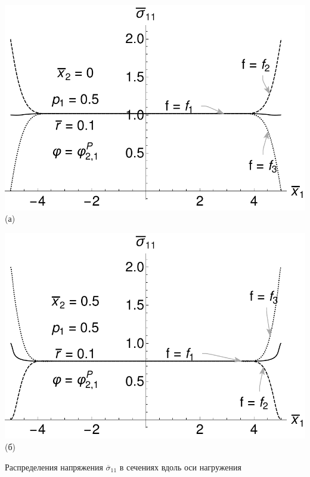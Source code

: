 \begin{frame}
	\centering
	\begin{minipage}{0.35\textwidth}
		\centering
		\includegraphics[width=\textwidth]{pics/SaintVenantX0P05.pdf} \\
		(а)
	\end{minipage}
	\begin{minipage}{0.35\textwidth}
		\centering
		\includegraphics[width=\textwidth]{pics/SaintVenantX05P05.pdf} \\
		(б)
	\end{minipage}
	
	Распределения напряжения $\overline{\sigma}_{11}$ в сечениях вдоль оси нагружения
	

\end{frame}
